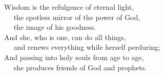 
\lettrine{W}{}isdom is the refulgence of eternal light,\\
   the spotless mirror of the power of God,\\
   the image of his goodness.\\
And she, who is one, can do all things,\\
   and renews everything while herself perduring;\\
And passing into holy souls from age to age,\\
   she produces friends of God and prophets.